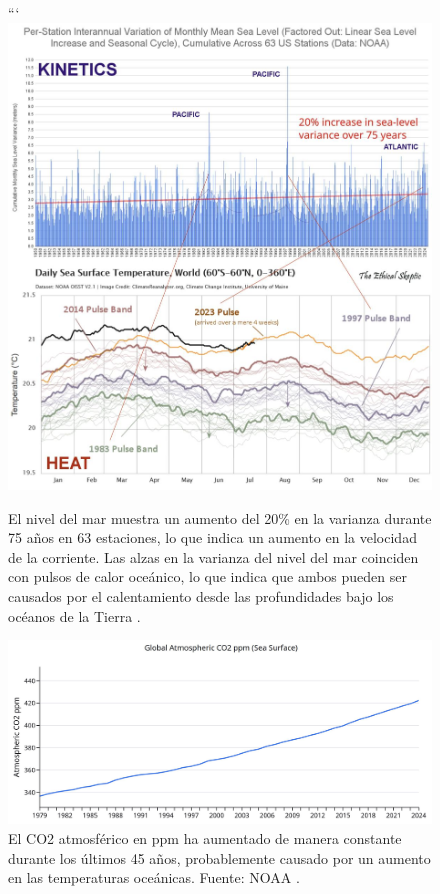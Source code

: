 \documentclass[10pt,twocolumn,letterpaper]{article}
\begin{document}
\begin{figure}[t]
\begin{center}
```
\includegraphics[width=1\textwidth]{sealevel.jpeg}
\end{center}
   \caption{El nivel del mar muestra un aumento del 20\% en la varianza durante 75 años en 63 estaciones, lo que indica un aumento en la velocidad de la corriente. Las alzas en la varianza del nivel del mar coinciden con pulsos de calor oceánico, lo que indica que ambos pueden ser causados por el calentamiento desde las profundidades bajo los océanos de la Tierra \cite{2,129}.}
\label{fig:22}
\end{figure}

\begin{figure}[t]
\begin{center}
\includegraphics[width=1\textwidth]{co2.jpg}
\end{center}
   \caption{El CO2 atmosférico en ppm ha aumentado de manera constante durante los últimos 45 años, probablemente causado por un aumento en las temperaturas oceánicas. Fuente: NOAA \cite{148,129}.}
\label{fig:23}
\end{figure}
\end{document}
